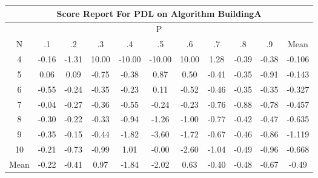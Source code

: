 \documentclass[11pt,a4paper]{report}
\begin{document}
\begin{longtable}{ | c || c | c | c | c | c | c | c | c | c || c |}
\hline
\multicolumn{11}{|c|}{ Score Report For PDL on Algorithm BuildingA} \\
\hline
\multicolumn{11}{|c|}{ P } \\
\hline
N & .1 & .2 & .3 & .4 & .5 & .6 & .7 & .8 & .9 & Mean\\
 \hline
 \hline
 \endhead
  4 &  \cellcolor[HTML]{FFF7F7} -0.16 &  \cellcolor[HTML]{FFDFDF} -1.31 &  \cellcolor[HTML]{0808FF} 10.00 &  \cellcolor[HTML]{FF0000} -10.00 &  \cellcolor[HTML]{FF0000} -10.00 &  \cellcolor[HTML]{0808FF} 10.00 &  \cellcolor[HTML]{DFDFFF} 1.28 &  \cellcolor[HTML]{FFF7F7} -0.39 &  \cellcolor[HTML]{FFF7F7} -0.38 & -0.106 \\
  5 &  \cellcolor[HTML]{FFFFFF} 0.06 &  \cellcolor[HTML]{FFFFFF} 0.09 &  \cellcolor[HTML]{FFEFEF} -0.75 &  \cellcolor[HTML]{FFF7F7} -0.38 &  \cellcolor[HTML]{E7E7FF} 0.87 &  \cellcolor[HTML]{EFEFFF} 0.50 &  \cellcolor[HTML]{FFF7F7} -0.41 &  \cellcolor[HTML]{FFF7F7} -0.35 &  \cellcolor[HTML]{FFE7E7} -0.91 & -0.143 \\
  6 &  \cellcolor[HTML]{FFEFEF} -0.55 &  \cellcolor[HTML]{FFF7F7} -0.24 &  \cellcolor[HTML]{FFF7F7} -0.35 &  \cellcolor[HTML]{FFF7F7} -0.23 &  \cellcolor[HTML]{FFFFFF} 0.11 &  \cellcolor[HTML]{FFEFEF} -0.52 &  \cellcolor[HTML]{FFF7F7} -0.46 &  \cellcolor[HTML]{FFF7F7} -0.35 &  \cellcolor[HTML]{FFF7F7} -0.35 & -0.327 \\
  7 &  \cellcolor[HTML]{FFFFFF} -0.04 &  \cellcolor[HTML]{FFF7F7} -0.27 &  \cellcolor[HTML]{FFF7F7} -0.36 &  \cellcolor[HTML]{FFEFEF} -0.55 &  \cellcolor[HTML]{FFF7F7} -0.24 &  \cellcolor[HTML]{FFF7F7} -0.23 &  \cellcolor[HTML]{FFEFEF} -0.76 &  \cellcolor[HTML]{FFE7E7} -0.88 &  \cellcolor[HTML]{FFEFEF} -0.78 & -0.457 \\
  8 &  \cellcolor[HTML]{FFF7F7} -0.30 &  \cellcolor[HTML]{FFF7F7} -0.22 &  \cellcolor[HTML]{FFF7F7} -0.33 &  \cellcolor[HTML]{FFE7E7} -0.94 &  \cellcolor[HTML]{FFDFDF} -1.26 &  \cellcolor[HTML]{FFE7E7} -1.00 &  \cellcolor[HTML]{FFEFEF} -0.77 &  \cellcolor[HTML]{FFF7F7} -0.42 &  \cellcolor[HTML]{FFF7F7} -0.47 & -0.635 \\
  9 &  \cellcolor[HTML]{FFF7F7} -0.35 &  \cellcolor[HTML]{FFFFFF} -0.15 &  \cellcolor[HTML]{FFF7F7} -0.44 &  \cellcolor[HTML]{FFCFCF} -1.82 &  \cellcolor[HTML]{FFA7A7} -3.60 &  \cellcolor[HTML]{FFD7D7} -1.72 &  \cellcolor[HTML]{FFEFEF} -0.67 &  \cellcolor[HTML]{FFF7F7} -0.46 &  \cellcolor[HTML]{FFE7E7} -0.86 & -1.119 \\
  10 &  \cellcolor[HTML]{FFF7F7} -0.21 &  \cellcolor[HTML]{FFEFEF} -0.73 &  \cellcolor[HTML]{FFE7E7} -0.99 &  \cellcolor[HTML]{E7E7FF} 1.01 &  \cellcolor[HTML]{FFFFFF} -0.00 &  \cellcolor[HTML]{FFBFBF} -2.60 &  \cellcolor[HTML]{FFE7E7} -1.04 &  \cellcolor[HTML]{FFEFEF} -0.49 &  \cellcolor[HTML]{FFE7E7} -0.96 & -0.668 \\
 \hline
 \hline
Mean &  \cellcolor[HTML]{FFF7F7} -0.22 &  \cellcolor[HTML]{FFF7F7} -0.41 &  \cellcolor[HTML]{E7E7FF} 0.97 &  \cellcolor[HTML]{FFCFCF} -1.84 &  \cellcolor[HTML]{FFCFCF} -2.02 &  \cellcolor[HTML]{EFEFFF} 0.63 &  \cellcolor[HTML]{FFF7F7} -0.40 &  \cellcolor[HTML]{FFEFEF} -0.48 &  \cellcolor[HTML]{FFEFEF} -0.67 &  \cellcolor[HTML]{FFEFEF} -0.49
\end{longtable}
\end{document}
